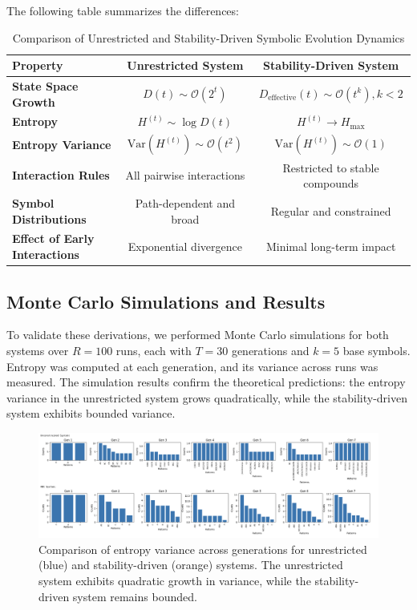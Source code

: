 \documentclass[%
 preprint, linenumbers,
 amsmath,amssymb,
 aps, physrev,
]{revtex4-2}
\begin{document}
The following table summarizes the differences:

\begin{table}[h!]
\caption{Comparison of Unrestricted and Stability-Driven Symbolic Evolution Dynamics}
\label{tab:comparison}
\begin{ruledtabular}
\begin{tabular}{lcc}
\textbf{Property} & \textbf{Unrestricted System} & \textbf{Stability-Driven System} \\ \hline
\textbf{State Space Growth} & $D(t) \sim \mathcal{O}(2^t)$ & $D_\text{effective}(t) \sim \mathcal{O}(t^k), k < 2$ \\ 
\textbf{Entropy} & $H^{(t)} \sim \log D(t)$ & $H^{(t)} \to H_\text{max}$ \\ 
\textbf{Entropy Variance} & $\text{Var}(H^{(t)}) \sim \mathcal{O}(t^2)$ & $\text{Var}(H^{(t)}) \sim \mathcal{O}(1)$ \\ 
\textbf{Interaction Rules} & All pairwise interactions & Restricted to stable compounds \\ 
\textbf{Symbol Distributions} & Path-dependent and broad & Regular and constrained \\ 
\textbf{Effect of Early Interactions} & Exponential divergence & Minimal long-term impact \\
\end{tabular}
\end{ruledtabular}
\end{table}


\subsection{Monte Carlo Simulations and Results}

To validate these derivations, we performed Monte Carlo simulations for both systems over \( R = 100 \) runs, each with \( T = 30 \) generations and \( k = 5 \) base symbols. Entropy was computed at each generation, and its variance across runs was measured. The simulation results confirm the theoretical predictions: the entropy variance in the unrestricted system grows quadratically, while the stability-driven system exhibits bounded variance.

\begin{figure}[h]
    \centering
    \includegraphics[width=1\linewidth]{monte-carlo-fits.png}
    \caption{Comparison of entropy variance across generations for unrestricted (blue) and stability-driven (orange) systems. The unrestricted system exhibits quadratic growth in variance, while the stability-driven system remains bounded.}
    \label{fig:entropy_variance}
\end{figure}
\end{document}
